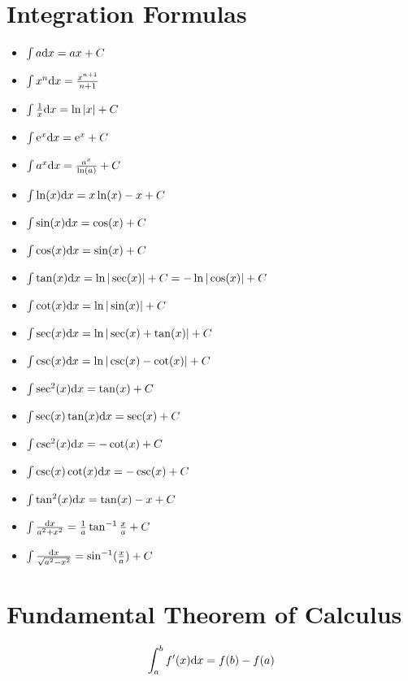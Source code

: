 \documentclass[letterpaper, 12pt]{math}
\begin{document}
\section{Integration Formulas}
\begin{itemize}
  \item \( \int{a\mathrm{d}{x} = ax+C} \)
  \item \( \int{x^{n}\mathrm{d}{x}} = \frac{x^{n+1}}{n + 1} \)
  \item \( \int{\frac{1}{x}\mathrm{d}{x} = \ln|x|+C} \)
  \item \( \int{\mathrm{e}^{x}\mathrm{d}{x} = \mathrm{e}^{x}+C} \)
  \item \( \int{a^{x}\mathrm{d}{x} = \frac{a^{x}}{\ln(a)}+C} \)
  \item \( \int{\ln(x)\mathrm{d}{x} = x\ln(x)-x+C} \)
  \item \( \int{\sin(x)\mathrm{d}{x} = \cos(x)+C} \)
  \item \( \int{\cos(x)\mathrm{d}{x} = \sin(x)+C} \)
  \item \( \int{\tan(x)\mathrm{d}{x} = \ln|\sec(x)|+C = -\ln|\cos(x)|+C} \)
  \item \( \int{\cot(x)\mathrm{d}{x} = \ln|\sin(x)|+C} \)
  \item \( \int{\sec(x)\mathrm{d}{x} = \ln|\sec(x)+\tan(x)|+C} \)
  \item \( \int{\csc(x)\mathrm{d}{x} = \ln|\csc(x)-\cot(x)|+C} \)
  \item \( \int{\sec^{2}(x)\mathrm{d}{x} = \tan(x)+C} \)
  \item \( \int{\sec(x)\tan(x)\mathrm{d}{x} = \sec(x)+C} \)
  \item \( \int{\csc^{2}(x)\mathrm{d}{x} = -\cot(x)+C} \)
  \item \( \int{\csc(x)\cot(x)\mathrm{d}{x} = -\csc(x)+C} \)
  \item \( \int{\tan^{2}(x)\mathrm{d}{x} = \tan(x)-x+C} \)
  \item \( \int{\frac{\mathrm{d}{x}}{a^{2}+x^{2}} =
          \frac{1}{a}\tan^{-1}{\frac{x}{a}}+C} \)
  \item \( \int{\frac{\mathrm{d}{x}}{\sqrt{a^{2}-x^{2}}} = \sin^{-1}(\frac{x}{a})+C} \)
\end{itemize}

\section{Fundamental Theorem of Calculus}
\[ \int_{a}^{b}{f'(x)\mathrm{d}{x} = f(b) - f(a)} \]
\end{document}

